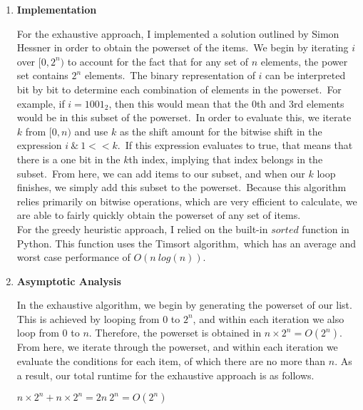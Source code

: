 \documentclass[12pt]{article}
\begin{document}
\begin{enumerate}
    \item \textbf{Implementation}
          
          For the exhaustive approach, I implemented a solution outlined by Simon Hessner in order to obtain the powerset of the items.\
          We begin by iterating $i$ over $[0, 2^n)$ to account for the fact that for any set of $n$ elements, the power set contains $2^n$ elements.\
          The binary representation of $i$ can be interpreted bit by bit to determine each combination of elements in the powerset.\
          For example, if $i = 1001_2$, then this would mean that the 0th and 3rd elements would be in this subset of the powerset.\
          In order to evaluate this, we iterate $k$ from $[0, n)$ and use $k$ as the shift amount for the bitwise shift in the expression $i\ \&\ 1<<k$.\
          If this expression evaluates to true, that means that there is a one bit in the $k$th index, implying that index belongs in the subset.\
          From here, we can add items to our subset, and when our $k$ loop finishes, we simply add this subset to the powerset.\
          Because this algorithm relies primarily on bitwise operations, which are very efficient to calculate, we are able to fairly quickly obtain the powerset of any set of items.
          \vspace{.1in}\\
          For the greedy heuristic approach, I relied on the built-in $sorted$ function in Python. This function uses the Timsort algorithm,\
          which has an average and worst case performance of $O(n\ log(n))$.
          
    \item \textbf{Asymptotic Analysis}
          
          In the exhaustive algorithm, we begin by generating the powerset of our list.
          This is achieved by looping from $0$ to $2^n$, and within each iteration we also loop from 0 to $n$.
          Therefore, the powerset is obtained in $n \times 2^n = O(2^n)$. From here, we iterate through the powerset,
          and within each iteration we evaluate the conditions for each item, of which there are no more than $n$.
          As a result, our total runtime for the exhaustive approach is as follows.
          
          \begin{center}
              $n \times 2^n + n \times 2^n = 2n\ 2^n = O(2^n)$
          \end{center}
          

\end{enumerate}
\end{document}

